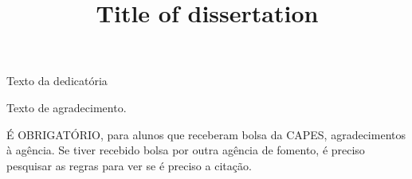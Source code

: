 \documentclass[a4paper,12pt,oneside,onecolumn,final,fleqn]{repUERJ}
\title{Title of dissertation}
\begin{document}
\frontmatter
\capa
\folhaderosto




\fichacatalografica{}



\begin{folhadeaprovacao}
\end{folhadeaprovacao}

\vfill
Texto da dedicatória

Texto de agradecimento.

É OBRIGATÓRIO, para alunos que receberam bolsa da CAPES, agradecimentos à agência. Se tiver recebido bolsa por outra agência de fomento, é preciso pesquisar as regras para ver se é preciso a citação. 
\end{document}
